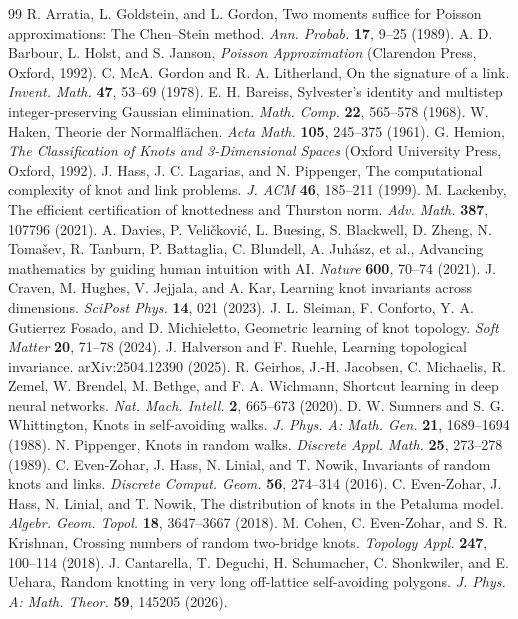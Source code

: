 \documentclass[9pt,twoside]{pnas-new}
\theoremstyle{definition}
\theoremstyle{remark}
\begin{document}
\begin{thebibliography}{99}
R. Arratia, L. Goldstein, and L. Gordon, Two moments suffice for Poisson approximations: The Chen--Stein method. \emph{Ann. Probab.} \textbf{17}, 9--25 (1989).
A. D. Barbour, L. Holst, and S. Janson, \emph{Poisson Approximation} (Clarendon Press, Oxford, 1992).
C. McA. Gordon and R. A. Litherland, On the signature of a link. \emph{Invent. Math.} \textbf{47}, 53--69 (1978).
E. H. Bareiss, Sylvester's identity and multistep integer-preserving Gaussian elimination. \emph{Math. Comp.} \textbf{22}, 565--578 (1968).
W. Haken, Theorie der Normalfl\"achen. \emph{Acta Math.} \textbf{105}, 245--375 (1961).
G. Hemion, \emph{The Classification of Knots and 3-Dimensional Spaces} (Oxford University Press, Oxford, 1992).
J. Hass, J. C. Lagarias, and N. Pippenger, The computational complexity of knot and link problems. \emph{J. ACM} \textbf{46}, 185--211 (1999).
M. Lackenby, The efficient certification of knottedness and Thurston norm. \emph{Adv. Math.} \textbf{387}, 107796 (2021).
A. Davies, P. Veli\v{c}kovi\'c, L. Buesing, S. Blackwell, D. Zheng, N. Toma\v{s}ev, R. Tanburn, P. Battaglia, C. Blundell, A. Juh\'asz, et al., Advancing mathematics by guiding human intuition with AI. \emph{Nature} \textbf{600}, 70--74 (2021).
J. Craven, M. Hughes, V. Jejjala, and A. Kar, Learning knot invariants across dimensions. \emph{SciPost Phys.} \textbf{14}, 021 (2023).
J. L. Sleiman, F. Conforto, Y. A. Gutierrez Fosado, and D. Michieletto, Geometric learning of knot topology. \emph{Soft Matter} \textbf{20}, 71--78 (2024).
J. Halverson and F. Ruehle, Learning topological invariance. arXiv:2504.12390 (2025).
R. Geirhos, J.-H. Jacobsen, C. Michaelis, R. Zemel, W. Brendel, M. Bethge, and F. A. Wichmann, Shortcut learning in deep neural networks. \emph{Nat. Mach. Intell.} \textbf{2}, 665--673 (2020).
D. W. Sumners and S. G. Whittington, Knots in self-avoiding walks. \emph{J. Phys. A: Math. Gen.} \textbf{21}, 1689--1694 (1988).
N. Pippenger, Knots in random walks. \emph{Discrete Appl. Math.} \textbf{25}, 273--278 (1989).
C. Even-Zohar, J. Hass, N. Linial, and T. Nowik, Invariants of random knots and links. \emph{Discrete Comput. Geom.} \textbf{56}, 274--314 (2016).
C. Even-Zohar, J. Hass, N. Linial, and T. Nowik, The distribution of knots in the Petaluma model. \emph{Algebr. Geom. Topol.} \textbf{18}, 3647--3667 (2018).
M. Cohen, C. Even-Zohar, and S. R. Krishnan, Crossing numbers of random two-bridge knots. \emph{Topology Appl.} \textbf{247}, 100--114 (2018).
J. Cantarella, T. Deguchi, H. Schumacher, C. Shonkwiler, and E. Uehara, Random knotting in very long off-lattice self-avoiding polygons. \emph{J. Phys. A: Math. Theor.} \textbf{59}, 145205 (2026).

\end{thebibliography}
\end{document}
